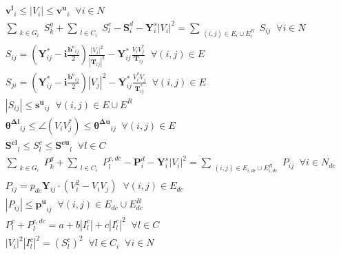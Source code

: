 \documentclass{article}
\begin{document}
\begin{align}
& \bm {v^l}_i \leq |V_i| \leq \bm {v^u}_i \;\; \forall i \in N \\
& \sum_{\substack{k \in G_i}} S^g_k + \sum_{\substack{l \in C_i}} S^c_l - {\bm S^d_i} - \bm Y^s_{i} |V_i|^2 = \sum_{\substack{(i,j)\in E_i \cup E_i^R}} S_{ij} \;\; \forall i\in N \\ 
& S_{ij} = \left( \bm Y^*_{ij} - \bm i\frac{\bm {b^c}_{ij}}{2} \right) \frac{|V_i|^2}{|\bm{T}_{ij}|^2} - \bm Y^*_{ij} \frac{V_i V^*_j}{\bm{T}_{ij}} \;\; \forall (i,j)\in E \\
& S_{ji} = \left( \bm Y^*_{ij} - \bm i\frac{\bm {b^c}_{ij}}{2} \right) |V_j|^2 - \bm Y^*_{ij} \frac{V^*_i V_j}{\bm{T}^*_{ij}} \;\; \forall (i,j)\in E \\
& |S_{ij}| \leq \bm {s^u}_{ij} \;\; \forall (i,j) \in E \cup E^R \\
& \bm {\theta^{\Delta l}}_{ij} \leq \angle (V_i V^*_j) \leq \bm {\theta^{\Delta u}}_{ij} \;\; \forall (i,j) \in E \\
& \bm {S^{cl}}_l \leq S^c_l \leq \bm {S^{cu}}_l \;\; \forall l \in C  \\
& \sum_{\substack{k \in G_i}} P^g_k + \sum_{\substack{l \in C_i}} P^{c, dc}_l - {\bm P^d_i} - \bm Y^s_{i} |V_i|^2 = \sum_{\substack{(i,j)\in E_{i, dc} \cup E_{i, dc}^R}} P_{ij} \;\; \forall i\in N_{dc} \\
& P_{ij} =  p_{dc} \bm Y_{ij} \cdot( V_i^2 - V_i V_j) \;\; \forall (i,j)\in E_{dc} \\
& |P_{ij}| \leq \bm {p^u}_{ij} \;\; \forall (i,j) \in E_{dc} \cup E_{dc}^R \\
& P^c_l + P^{c, dc}_l = a + b |I^c_l| + c |I^c_l|^2  \;\; \forall l \in C \\
& |V_i|^2 |I^c_l|^2 = (S^c_l)^2 \;\; \forall l \in C_i \;\; \forall i \in N \\
%
\end{align}
\end{document}

